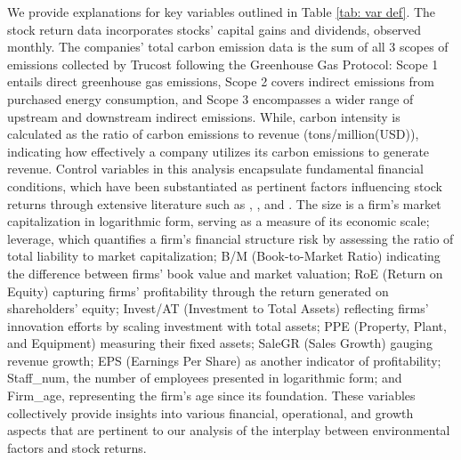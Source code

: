 \documentclass[12pt]{article}
\begin{document}
We provide explanations for key variables outlined in Table \ref{tab: var def}. The stock return data incorporates stocks' capital gains and dividends, observed monthly. The companies' total carbon emission data is the sum of all 3 scopes of emissions collected by Trucost following the Greenhouse Gas Protocol: Scope 1 entails direct greenhouse gas emissions, Scope 2 covers indirect emissions from purchased energy consumption, and Scope 3 encompasses a wider range of upstream and downstream indirect emissions. While, carbon intensity is calculated as the ratio of carbon emissions to revenue (tons/million(USD)), indicating how effectively a company utilizes its carbon emissions to generate revenue. Control variables in this analysis encapsulate fundamental financial conditions, which have been substantiated as pertinent factors influencing stock returns through extensive literature such as \cite{perez2000firm}, \cite{george2010resolution}, and \cite{lamont2000investment}. The size is a firm's market capitalization in logarithmic form, serving as a measure of its economic scale; leverage, which quantifies a firm's financial structure risk by assessing the ratio of total liability to market capitalization; B/M (Book-to-Market Ratio) indicating the difference between firms' book value and market valuation; RoE (Return on Equity) capturing firms' profitability through the return generated on shareholders' equity; Invest/AT (Investment to Total Assets) reflecting firms' innovation efforts by scaling investment with total assets; PPE (Property, Plant, and Equipment) measuring their fixed assets; SaleGR (Sales Growth) gauging revenue growth; EPS (Earnings Per Share) as another indicator of profitability; Staff\_num, the number of employees presented in logarithmic form; and Firm\_age, representing the firm's age since its foundation. These variables collectively provide insights into various financial, operational, and growth aspects that are pertinent to our analysis of the interplay between environmental factors and stock returns.
\end{document}
